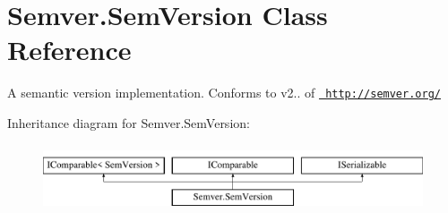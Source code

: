 \hypertarget{class_semver_1_1_sem_version}{}\section{Semver.\+Sem\+Version Class Reference}
\label{class_semver_1_1_sem_version}


A semantic version implementation. Conforms to v2.. of \href{http://semver.org/}{\texttt{ http\+://semver.\+org/}}  


Inheritance diagram for Semver.\+Sem\+Version\+:\begin{figure}[H]
\begin{center}
\leavevmode
\includegraphics[height=2.000000cm]{class_semver_1_1_sem_version}
\end{center}
\end{figure}
